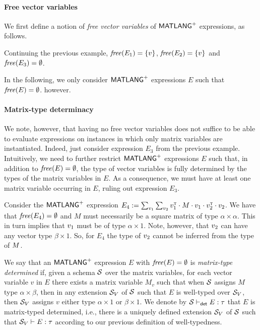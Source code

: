 \paragraph{Free vector variables}
We first define a notion of \textit{free vector variables} of $\mathsf{MATLANG}^{\sf +}$ expressions, as follows.


\begin{example}
Continuing the previous example, $\operatorname{\mathit{free}}(E_1)=\{v\}$, $\operatorname{\mathit{free}}(E_2)=\{v\}$ and 
$\operatorname{\mathit{free}}(E_3)=\emptyset$.
\end{example}


In the following, we only consider $\mathsf{MATLANG}^{\sf +}$ expressions $E$ such that $\operatorname{\mathit{free}}(E)=\emptyset$. 
however. 

\paragraph{Matrix-type determinacy}
We note, however, that having no free vector variables does not suffice to be able to evaluate expressions on instances in which only
matrix variables are instantiated. Indeed, just consider expression $E_3$ from the previous example.
Intuitively, we need to further restrict $\mathsf{MATLANG}^{\sf +}$ expressions $E$ such that, in addition to $\operatorname{\mathit{free}}(E)=\emptyset$,
the type of vector variables is fully determined by the types of the matrix variables in $E$.  
As a consequence,
we must have at least one matrix variable occurring in $E$, ruling out expression $E_3$. 

\begin{example}
Consider  the $\mathsf{MATLANG}^{\sf +}$ expression $E_4:=\sum_{v_1}\sum_{v_2} v_1^{\textsc{t}}\cdot M\cdot v_1\cdot v_2^{\textsc{t}}\cdot v_2$.
We have that $\operatorname{\mathit{free}}(E_4)=\emptyset$ and $M$ must necessarily be a square matrix of type $\alpha\times\alpha$. This in turn 
implies that $v_1$ must be  of type $\alpha\times 1$. Note, however, that $v_2$ can have any vector type $\beta\times 1$. So, for $E_4$ the type of $v_2$ cannot be inferred from 
the type of $M$.
\end{example}

We say that  an $\mathsf{MATLANG}^{\sf +}$ expression $E$ with $\operatorname{\mathit{free}}(E)=\emptyset$ is \textit{matrix-type determined}
if, given a schema $\mathcal{S}$ over the matrix variables, for each vector variable $v$ in $E$ 
there exists a matrix variable $M_v$ such that when $\mathcal{S}$ assigns $M$ type $\alpha\times\beta$,
then in any extension $\mathcal{S}_V$ of $\mathcal{S}$ such that $E$ is well-typed over $\mathcal{S}_V$, then
$\mathcal{S}_V$ assigns $v$  either type $\alpha\times 1$ or $\beta\times 1$. We denote by $\mathcal{S}\vdash_{\textsf{det}}E:\tau$ that $E$
is matrix-typed determined, i.e., there is a uniquely defined extension $\mathcal{S}_V$ of $\mathcal{S}$ such that $\mathcal{S}_V\vdash E:\tau$
according to our previous definition of well-typedness. 

